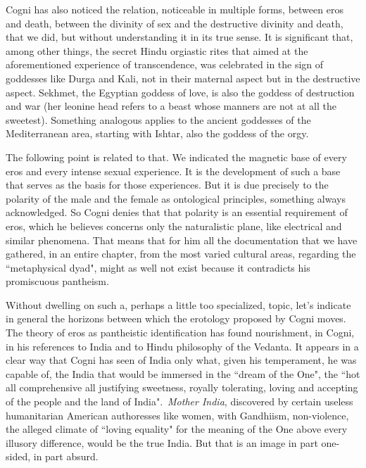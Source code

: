 Cogni has also noticed the relation, noticeable in multiple forms, between eros and death, between the divinity of sex
and the destructive divinity and death, that we did, but without understanding it in its true sense. It is significant
that, among other things, the secret Hindu orgiastic rites that aimed at the aforementioned experience of
transcendence, was celebrated in the sign of goddesses like Durga and Kali, not in their maternal aspect but in the
destructive aspect. Sekhmet, the Egyptian goddess of love, is also the goddess of destruction and war (her leonine head
refers to a beast whose manners are not at all the sweetest). Something analogous applies to the ancient goddesses of
the Mediterranean area, starting with Ishtar, also the goddess of the orgy.

The following point is related to that. We indicated the magnetic base of every eros and every intense sexual
experience. It is the development of such a base that serves as the basis for those experiences. But it is due
precisely to the polarity of the male and the female as ontological principles, something always acknowledged. So Cogni
denies that that polarity is an essential requirement of eros, which he believes concerns only the naturalistic plane,
like electrical and similar phenomena. That means that for him all the documentation that we have gathered, in an
entire chapter, from the most varied cultural areas, regarding the ``metaphysical dyad", might as well not exist because
it contradicts his promiscuous pantheism.

Without dwelling on such a, perhaps a little too specialized, topic, let's indicate in general the
horizons between which the erotology proposed by Cogni moves. The theory of eros as pantheistic identification has
found nourishment, in Cogni, in his references to India and to Hindu philosophy of the Vedanta. It appears in a clear
way that Cogni has seen of India only what, given his temperament, he was capable of, the India that would be immersed
in the ``dream of the One", the ``hot all comprehensive all justifying sweetness, royally tolerating, loving and
accepting of the people and the land of India". \emph{Mother India}, discovered by certain useless humanitarian
American authoresses like women, with Gandhiism, non-violence, the alleged climate of ``loving equality" for the meaning
of the One above every illusory difference, would be the true India. But that is an image in part one-sided, in part
absurd.

